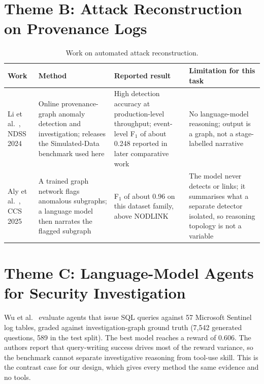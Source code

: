 \section{Theme B: Attack Reconstruction on Provenance Logs}
\begin{table}[H]
\centering
\caption{Work on automated attack reconstruction.}
\label{tab:lit-b}
\footnotesize
\begin{tabularx}{\textwidth}{@{}>{\raggedright\arraybackslash}p{2.5cm} >{\raggedright\arraybackslash}p{3.2cm} Y Y@{}}
\toprule
\textbf{Work} & \textbf{Method} & \textbf{Reported result} & \textbf{Limitation for this task} \\
\midrule
Li et al.~\cite{li2024nodlink}, NDSS 2024 & Online provenance-graph anomaly detection and investigation; releases the Simulated-Data benchmark used here & High detection accuracy at production-level throughput; event-level F$_1$ of about 0.248 reported in later comparative work & No language-model reasoning; output is a graph, not a stage-labelled narrative \\
Aly et al.~\cite{aly2025ocrapt}, CCS 2025 & A trained graph network flags anomalous subgraphs; a language model then narrates the flagged subgraph & F$_1$ of about 0.96 on this dataset family, above NODLINK & The model never detects or links; it summarises what a separate detector isolated, so reasoning topology is not a variable \\
\bottomrule
\end{tabularx}
\end{table}

\section{Theme C: Language-Model Agents for Security Investigation}
Wu et al.~\cite{wu2026excytin} evaluate agents that issue SQL queries against 57 Microsoft Sentinel log tables, graded against investigation-graph ground truth (7,542 generated questions, 589 in the test split). The best model reaches a reward of 0.606. The authors report that query-writing success drives most of the reward variance, so the benchmark cannot separate investigative reasoning from tool-use skill. This is the contrast case for our design, which gives every method the same evidence and no tools.


